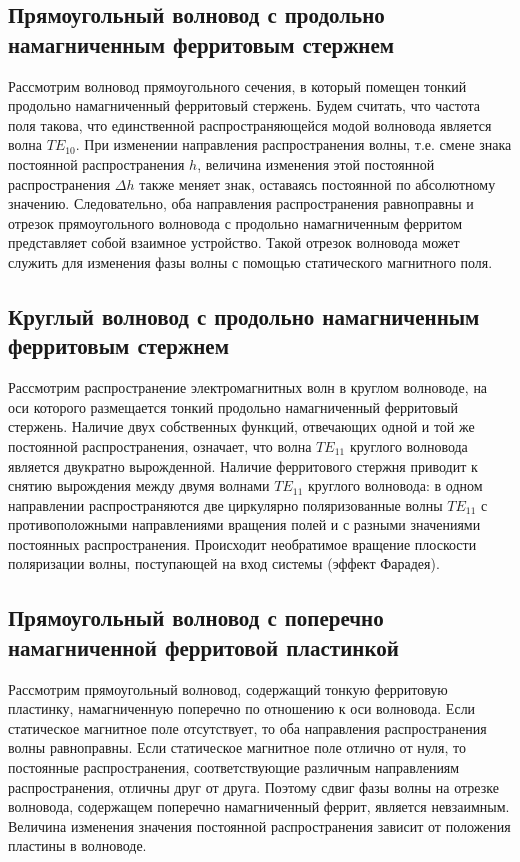 \subsection{Прямоугольный волновод с продольно намагниченным ферритовым стержнем}
Рассмотрим волновод прямоугольного сечения, в который помещен тонкий продольно намагниченный ферритовый стержень. Будем
считать, что частота поля такова, что единственной распространяющейся модой волновода является волна $TE_{10}$. При
изменении направления распространения волны, т.е. смене знака постоянной распространения $h$, величина изменения этой
постоянной распространения $\Delta h$ также меняет знак, оставаясь постоянной по абсолютному значению. Следовательно,
оба направления распространения равноправны и отрезок прямоугольного волновода с продольно намагниченным ферритом
представляет собой взаимное устройство. Такой отрезок волновода может служить для изменения фазы волны с помощью
статического магнитного поля.
\subsection{Круглый волновод с продольно намагниченным ферритовым стержнем}
Рассмотрим распространение электромагнитных волн в круглом волноводе, на оси которого размещается тонкий продольно
намагниченный ферритовый стержень. Наличие двух собственных функций, отвечающих одной и той же постоянной
распространения, означает, что волна $TE_{11}$ круглого волновода является двукратно вырожденной. Наличие ферритового
стержня приводит к снятию вырождения между двумя волнами $TE_{11}$ круглого волновода: в одном направлении
распространяются две циркулярно поляризованные волны $TE_{11}$ с противоположными направлениями вращения полей и с
разными значениями постоянных распространения. Происходит необратимое вращение плоскости поляризации волны, поступающей
на вход системы (эффект Фарадея).
\subsection{Прямоугольный волновод с поперечно намагниченной ферритовой пластинкой}
Рассмотрим прямоугольный волновод, содержащий тонкую ферритовую пластинку, намагниченную поперечно по отношению к оси
волновода. Если статическое магнитное поле отсутствует, то оба направления распространения волны равноправны. Если
статическое магнитное поле отлично от нуля, то постоянные распространения, соответствующие различным направлениям
распространения, отличны друг от друга. Поэтому сдвиг фазы волны на отрезке волновода, содержащем поперечно
намагниченный феррит, является невзаимным. Величина изменения значения постоянной распространения зависит от положения
пластины в волноводе. 

